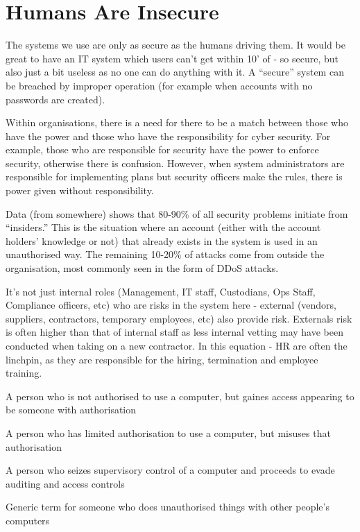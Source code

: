 \section{Humans Are Insecure}
The systems we use are only as secure as the humans driving them. It would be great to have an IT system which users can't get within 10' of - so secure, but also just a bit useless as no one can do anything with it. A ``secure'' system can be breached by improper operation (for example when accounts with no passwords are created). 

Within organisations, there is a need for there to be a match between those who have the power and those who have the responsibility for cyber security. For example, those who are responsible for security have the power to enforce security, otherwise there is confusion. However, when system administrators are responsible for implementing plans but security officers make the rules, there is power given without responsibility. 

Data (from somewhere) shows that 80-90\% of all security problems initiate from ``insiders.'' This is the situation where an account (either with the account holders' knowledge or not) that already exists in the system is used in an unauthorised way. The remaining 10-20\% of attacks come from outside the organisation, most commonly seen in the form of DDoS attacks. 

It's not just internal roles (Management, IT staff, Custodians, Ops Staff, Compliance officers, etc) who are risks in the system here - external (vendors, suppliers, contractors, temporary employees, etc) also provide risk. Externals risk is often higher than that of internal staff as less internal vetting may have been conducted when taking on a new contractor. In this equation - HR are often the linchpin, as they are responsible for the hiring, termination and employee training.

\begin{define}
    \item[Masquerader] A person who is not authorised to use a computer, but gaines access appearing to be someone with authorisation
    \item[Misfeasor] A person who has limited authorisation to use a computer, but misuses that authorisation
    \item[Clandestine User] A person who seizes supervisory control of a computer and proceeds to evade auditing and access controls
    \item[Hacker] Generic term for someone who does unauthorised things with other people's computers
\end{define}


